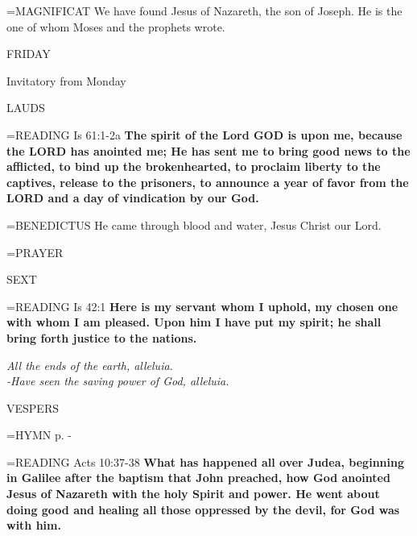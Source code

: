 \hangindent=\parindent \small{MAGNIFICAT 	We have found Jesus of Nazareth, the son of Joseph. He is the one of whom Moses and the prophets wrote.\\}

\begin{center}
\normalsize FRIDAY
\end{center}

Invitatory from Monday

\begin{flushleft}\normalsize LAUDS\\\end{flushleft}

\hangindent=\parindent \small{READING}    Is 61:1-2a \textbf{   The spirit of the Lord GOD is upon me, because the LORD has anointed me; He has sent me to bring good news to the afflicted, to bind up the brokenhearted, to proclaim liberty to the captives, release to the prisoners, to announce a year of favor from the LORD and a day of vindication by our God.\\}

\hangindent=\parindent \small{BENEDICTUS 	He came through blood and water, Jesus Christ our Lord.\\}

\hangindent=\parindent \small{PRAYER 	}

\begin{flushleft}\normalsize SEXT\\\end{flushleft}

\hangindent=\parindent \small{READING}    Is 42:1 \textbf{   Here is my servant whom I uphold, my chosen one with whom I am pleased. Upon him I have put my spirit; he shall bring forth justice to the nations.}

\begin{center}
\textit{All the ends of the earth, alleluia.\\
-Have seen the saving power of God, alleluia.}
\end{center}

\begin{flushleft}\normalsize VESPERS\\\end{flushleft}

\hangindent=\parindent \small{\uppercase{HYMN} p.  \pageref{christmas:firstHymn} - \pageref{christmas:lastHymn}\\}

\hangindent=\parindent \small{READING}    Acts 10:37-38 \textbf{   What has happened all over Judea, beginning in Galilee after the baptism that John preached, how God anointed Jesus of Nazareth with the holy Spirit and power. He went about doing good and healing all those oppressed by the devil, for God was with him.\\}

